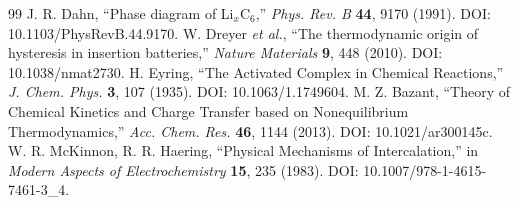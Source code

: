 \documentclass[11pt,a4paper]{article}
\begin{document}
\begin{thebibliography}{99}
 J. R. Dahn, ``Phase diagram of Li$_x$C$_6$,'' \emph{Phys. Rev. B} \textbf{44}, 9170 (1991). DOI: 10.1103/PhysRevB.44.9170.
 W. Dreyer \emph{et al.}, ``The thermodynamic origin of hysteresis in insertion batteries,'' \emph{Nature Materials} \textbf{9}, 448 (2010). DOI: 10.1038/nmat2730.
 H. Eyring, ``The Activated Complex in Chemical Reactions,'' \emph{J. Chem. Phys.} \textbf{3}, 107 (1935). DOI: 10.1063/1.1749604.
 M. Z. Bazant, ``Theory of Chemical Kinetics and Charge Transfer based on Nonequilibrium Thermodynamics,'' \emph{Acc. Chem. Res.} \textbf{46}, 1144 (2013). DOI: 10.1021/ar300145c.
 W. R. McKinnon, R. R. Haering, ``Physical Mechanisms of Intercalation,'' in \emph{Modern Aspects of Electrochemistry} \textbf{15}, 235 (1983). DOI: 10.1007/978-1-4615-7461-3\_4.
\end{thebibliography}
\end{document}
